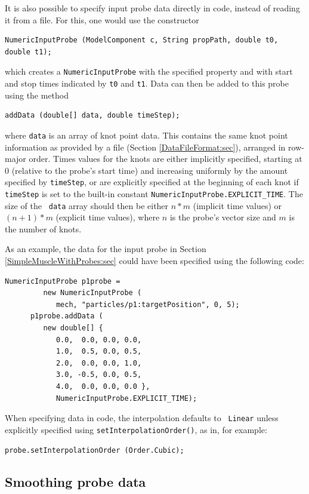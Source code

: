 It is also possible to specify input probe data directly in code,
instead of reading it from a file. For this, one would use the
constructor
\begin{lstlisting}[]
   NumericInputProbe (ModelComponent c, String propPath, double t0, double t1);
\end{lstlisting}
%
which creates a {\tt NumericInputProbe} with the specified property
and with start and stop times indicated by {\tt t0} and {\tt t1}.
Data can then be added to this probe using the method
\begin{lstlisting}[]
   addData (double[] data, double timeStep);
\end{lstlisting}
%
where {\tt data} is an array of knot point data. This contains the
same knot point information as provided by a file (Section
\ref{DataFileFormat:sec}), arranged in row-major order.  Times values
for the knots are either implicitly specified, starting at 0 (relative
to the probe's start time) and increasing uniformly by the amount
specified by {\tt timeStep}, or are explicitly specified at the
beginning of each knot if {\tt timeStep} is set to the built-in
constant {\tt NumericInputProbe.EXPLICIT\_TIME}. The size of the {\tt
data} array should then be either $n*m$ (implicit time values) or
$(n+1)*m$ (explicit time values), where $n$ is the probe's vector size
and $m$ is the number of knots.

As an example, the data for the input probe in Section
\ref{SimpleMuscleWithProbes:sec} could have been specified
using the following code:
%
\begin{lstlisting}[]
      NumericInputProbe p1probe =
         new NumericInputProbe (
            mech, "particles/p1:targetPosition", 0, 5);
      p1probe.addData (
         new double[] {
            0.0,  0.0, 0.0, 0.0,
            1.0,  0.5, 0.0, 0.5,
            2.0,  0.0, 0.0, 1.0,
            3.0, -0.5, 0.0, 0.5,
            4.0,  0.0, 0.0, 0.0 },
            NumericInputProbe.EXPLICIT_TIME);
\end{lstlisting}

When specifying data in code, the interpolation defaults to {\tt
Linear} unless explicitly specified using\pdfbreak
{\tt setInterpolationOrder()}, as in, for example:
%
\begin{lstlisting}[]
   probe.setInterpolationOrder (Order.Cubic);
\end{lstlisting}
%

\subsection{Smoothing probe data}
\label{SmoothingProbeData:sec}

